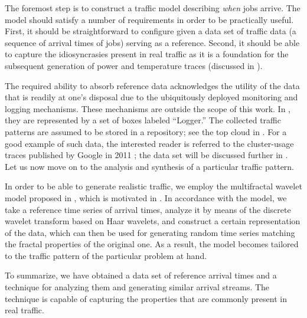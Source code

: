 The foremost step is to construct a traffic model describing \emph{when} jobs
arrive. The model should satisfy a number of requirements in order to be
practically useful. First, it should be straightforward to configure given a
data set of traffic data (a sequence of arrival times of jobs) serving as a
reference. Second, it should be able to capture the idiosyncrasies present in
real traffic as it is a foundation for the subsequent generation of power and
temperature traces (discussed in ).

The required ability to absorb reference data acknowledges the utility of the
data that is readily at one's disposal due to the ubiquitously deployed
monitoring and logging mechanisms. These mechanisms are outside the scope of
this work. In , they are represented by a set of boxes labeled
``Logger.'' The collected traffic patterns are assumed to be stored in a
repository; see the top cloud in . For a good example of such
data, the interested reader is referred to the cluster-usage traces published by
Google in 2011 \cite{reiss2011}; the data set will be discussed further in
. Let us now move on to the analysis and synthesis of a particular
traffic pattern.

In order to be able to generate realistic traffic, we employ the multifractal
wavelet model proposed in \cite{riedi1999}, which is motivated in
. In accordance with the model, we take a reference time series
of arrival times, analyze it by means of the discrete wavelet transform based on
Haar wavelets, and construct a certain representation of the data, which can
then be used for generating random time series matching the fractal properties
of the original one. As a result, the model becomes tailored to the traffic
pattern of the particular problem at hand.

To summarize, we have obtained a data set of reference arrival times and a
technique for analyzing them and generating similar arrival streams. The
technique is capable of capturing the properties that are commonly present in
real traffic.
